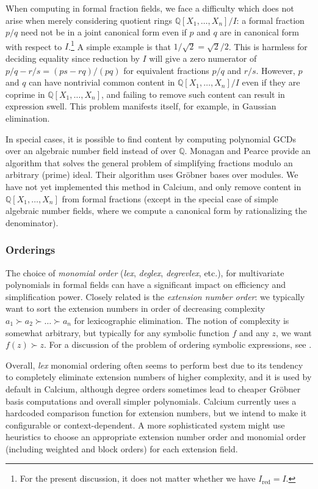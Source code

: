 \documentclass[sigconf,screen,urlbreakonhyphens]{acmart}
\begin{document}
When computing in formal fraction fields,
we face a difficulty
which does not arise when merely considering
quotient rings
$\mathbb{Q}[X_1,\ldots,X_n] / I$:
a formal fraction $p / q$ need not be
in a joint canonical form even if $p$ and $q$ are in canonical
form with respect to $I$.\footnote{For the present discussion, it does
not matter whether we have $I_{\text{red}} = I$.}
A simple example is that $1/\sqrt{2} = \sqrt{2}/2$.
This is harmless for deciding equality since
reduction by $I$ will give a zero numerator of
$p / q - r / s = (ps - rq)/(pq)$ for equivalent fractions $p/q$ and $r/s$.
However, $p$ and $q$ can have nontrivial
common content in $\mathbb{Q}[X_1,\ldots,X_n] / I$
even if they are coprime in $\mathbb{Q}[X_1,\ldots,X_n]$,
and failing to remove such content can result in expression swell.
This problem manifests itself, for example, in Gaussian elimination.

In special cases, it is possible to find
content by computing polynomial GCDs over an algebraic number field
instead of over $\mathbb{Q}$.
Monagan and Pearce \cite{Mon2006} provide
an algorithm that solves the general problem of simplifying
fractions modulo an arbitrary (prime) ideal.
Their algorithm uses Gr\"{o}bner bases over modules.
We have not yet implemented this method in Calcium,
and only remove content in $\mathbb{Q}[X_1,\ldots,X_n]$
from formal fractions
(except in the special case of simple algebraic number fields,
where we compute a canonical form by rationalizing the denominator).

\subsubsection{Orderings}

The choice of \emph{monomial order} (\emph{lex}, \emph{deglex}, \emph{degrevlex}, etc.),
for multivariate polynomials in formal fields
can have a significant impact on efficiency and simplification power.
Closely related is the \emph{extension number order}: we typically
want to sort the extension numbers
in order of decreasing
complexity $a_1 \succ a_2 \succ \ldots \succ a_n$
for lexicographic elimination.
The notion of complexity is somewhat
arbitrary, but typically for any symbolic function $f$ and
any $z$, we want $f(z) \succ z$. For a discussion
of the problem of ordering symbolic expressions, see \cite{Mos1971,Car2004}.

Overall, \emph{lex} monomial ordering often seems to perform best
due to its tendency to completely eliminate extension numbers of higher complexity,
and it is used by default in Calcium,
although degree orders sometimes lead to cheaper
Gr\"{o}bner basis computations and overall simpler polynomials.
Calcium currently uses a hardcoded comparison function for
extension numbers, but we intend
to make it configurable or context-dependent.
A more sophisticated system might use heuristics
to choose an appropriate extension number order and monomial order (including
weighted and block orders) for each extension field.
\end{document}
